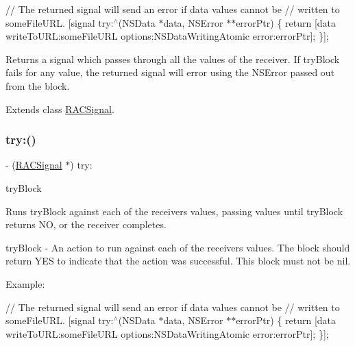 // The returned signal will send an error if data values cannot be // written to {\ttfamily some\+File\+U\+RL}. \mbox{[}signal try\+:$^\wedge$(N\+S\+Data $\ast$data, N\+S\+Error $\ast$$\ast$error\+Ptr) \{ return \mbox{[}data write\+To\+U\+RL\+:some\+File\+U\+RL options\+:N\+S\+Data\+Writing\+Atomic error\+:error\+Ptr\mbox{]}; \}\mbox{]};

Returns a signal which passes through all the values of the receiver. If {\ttfamily try\+Block} fails for any value, the returned signal will error using the {\ttfamily N\+S\+Error} passed out from the block. 

Extends class \mbox{\hyperlink{interface_r_a_c_signal_ac65d7a1a19db9cb2f78c03781995bbe9}{R\+A\+C\+Signal}}.

\mbox{\label{category_r_a_c_signal_07_operations_08_ac65d7a1a19db9cb2f78c03781995bbe9}} 
\subsubsection{\texorpdfstring{try\+:()}{try:()}\hspace{0.1cm}{\footnotesize\ttfamily [2/3]}}
{\footnotesize\ttfamily -\/ (\mbox{\hyperlink{interface_r_a_c_signal}{R\+A\+C\+Signal}} $\ast$) try\+: \begin{DoxyParamCaption}\item[{(B\+O\+OL($^\wedge$)(id value, N\+S\+Error $\ast$$\ast$error\+Ptr))}]{try\+Block }\end{DoxyParamCaption}}

Runs {\ttfamily try\+Block} against each of the receiver\textquotesingle{}s values, passing values until {\ttfamily try\+Block} returns NO, or the receiver completes.

try\+Block -\/ An action to run against each of the receiver\textquotesingle{}s values. The block should return Y\+ES to indicate that the action was successful. This block must not be nil.

Example\+:

// The returned signal will send an error if data values cannot be // written to {\ttfamily some\+File\+U\+RL}. \mbox{[}signal try\+:$^\wedge$(N\+S\+Data $\ast$data, N\+S\+Error $\ast$$\ast$error\+Ptr) \{ return \mbox{[}data write\+To\+U\+RL\+:some\+File\+U\+RL options\+:N\+S\+Data\+Writing\+Atomic error\+:error\+Ptr\mbox{]}; \}\mbox{]};

